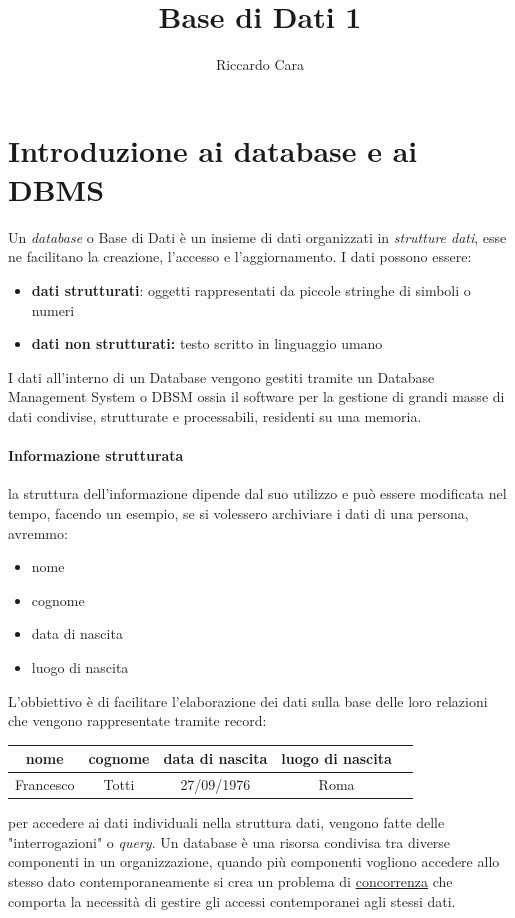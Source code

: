 \documentclass{article}
\title{Base di Dati 1}
\author{Riccardo Cara}
\begin{document}
\maketitle

\tableofcontents
\newpage

\section{Introduzione ai database e ai DBMS}

    Un \textit{database} o Base di Dati è un insieme di dati organizzati in \textit{strutture dati}, esse ne facilitano la creazione, l'accesso e l'aggiornamento.
    I dati possono essere:

    \begin{itemize}
        \item \textbf{dati strutturati}:
        oggetti rappresentati da piccole stringhe di simboli o numeri

        \item \textbf{dati non strutturati:}
        testo scritto in linguaggio umano
        \end{itemize}

    I dati all'interno di un Database vengono gestiti tramite un Database Management System o DBSM ossia il software per la gestione di grandi masse di dati condivise, strutturate e processabili, residenti su una memoria.

    \paragraph{Informazione strutturata} la struttura dell'informazione dipende dal suo utilizzo e può essere modificata nel tempo, facendo un esempio, se si volessero archiviare i dati di una persona, avremmo:
    \begin{itemize}
        \item{nome}
        \item{cognome}
        \item{data di nascita}
        \item{luogo di nascita}
    \end{itemize}
    L'obbiettivo è di facilitare l'elaborazione dei dati sulla base delle loro relazioni che vengono rappresentate tramite record\label{word:record}:

    \begin{center}
    \begin{tabular}{|c|c|c|c|c|}
        \hline 
        \textbf{nome} & \textbf{cognome} & \textbf{data di nascita}& \textbf{luogo di nascita} \\
        \hline
        Francesco & Totti & 27/09/1976& Roma\\
        \hline
    \end{tabular}
    \end{center}
    per accedere ai dati individuali nella struttura dati, vengono fatte delle "interrogazioni" o \textit{query}. Un database è una risorsa condivisa tra diverse componenti in un organizzazione, quando più componenti vogliono accedere allo stesso dato contemporaneamente si crea un problema di \hyperref[sec:concorrenza]{concorrenza} che comporta la necessità di gestire gli accessi contemporanei agli stessi dati.
\end{document}
